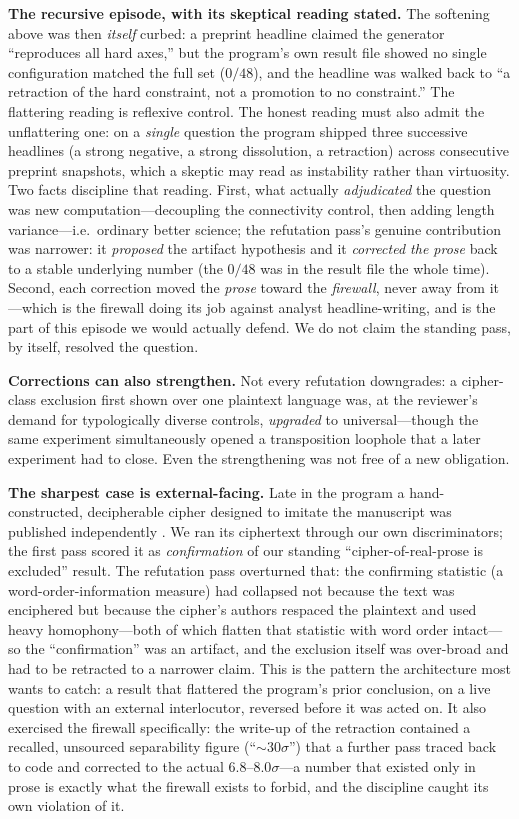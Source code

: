 \documentclass[11pt]{article}
\begin{document}
\textbf{The recursive episode, with its skeptical reading stated.} The softening above was
then \emph{itself} curbed: a preprint headline claimed the generator ``reproduces all hard
axes,'' but the program's own result file showed no single configuration matched the full set
($0/48$), and the headline was walked back to ``a retraction of the hard constraint, not a
promotion to no constraint.'' The flattering reading is reflexive control. The honest reading
must also admit the unflattering one: on a \emph{single} question the program shipped three
successive headlines (a strong negative, a strong dissolution, a retraction) across
consecutive preprint snapshots, which a skeptic may read as instability rather than
virtuosity. Two facts discipline that reading. First, what actually \emph{adjudicated} the
question was new computation---decoupling the connectivity control, then adding length
variance---i.e.\ ordinary better science; the refutation pass's genuine contribution was
narrower: it \emph{proposed} the artifact hypothesis and it \emph{corrected the prose} back to
a stable underlying number (the $0/48$ was in the result file the whole time). Second, each
correction moved the \emph{prose} toward the \emph{firewall}, never away from it---which is
the firewall doing its job against analyst headline-writing, and is the part of this episode
we would actually defend. We do not claim the standing pass, by itself, resolved the question.

\textbf{Corrections can also strengthen.} Not every refutation downgrades: a cipher-class
exclusion first shown over one plaintext language was, at the reviewer's demand for
typologically diverse controls, \emph{upgraded} to universal---though the same experiment
simultaneously opened a transposition loophole that a later experiment had to close. Even the
strengthening was not free of a new obligation.

\textbf{The sharpest case is external-facing.} Late in the program a hand-constructed,
decipherable cipher designed to imitate the manuscript was published independently
\citep{greshko2025naibbe}. We ran its ciphertext through our own discriminators; the first pass
scored it as \emph{confirmation} of our standing ``cipher-of-real-prose is excluded'' result.
The refutation pass overturned that: the confirming statistic (a word-order-information measure)
had collapsed not because the text was enciphered but because the cipher's authors respaced the
plaintext and used heavy homophony---both of which flatten that statistic with word order
intact---so the ``confirmation'' was an artifact, and the exclusion itself was over-broad and had
to be retracted to a narrower claim. This is the pattern the architecture most wants to catch: a
result that flattered the program's prior conclusion, on a live question with an external
interlocutor, reversed before it was acted on. It also exercised the firewall specifically: the
write-up of the retraction contained a recalled, unsourced separability figure (``$\sim\!30\sigma$'')
that a further pass traced back to code and corrected to the actual $6.8$--$8.0\sigma$---a number
that existed only in prose is exactly what the firewall exists to forbid, and the discipline
caught its own violation of it.
\end{document}
